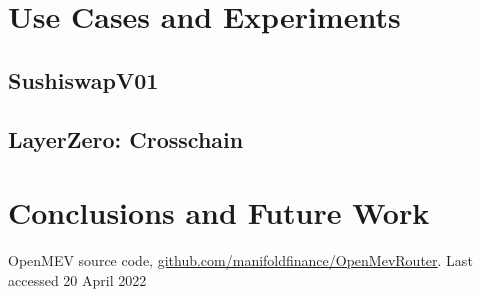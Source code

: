 \documentclass[runningheads]{llncs}
\begin{document}
\section{Use Cases and Experiments}

\subsection{SushiswapV01}

\subsection{LayerZero: Crosschain}

\section{Conclusions and Future Work}

%
%
%
% 
% 
%
\begin{thebibliography}{1}
OpenMEV source code, \url{github.com/manifoldfinance/OpenMevRouter}.
Last accessed 20 April 2022
\end{thebibliography}
\end{document}

